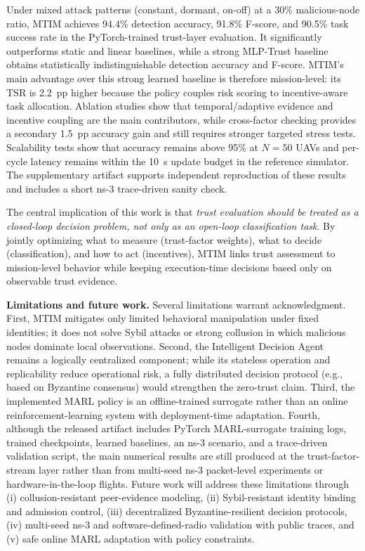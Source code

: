 \documentclass[notspecified,article,submit,moreauthors]{Definitions/mdpi}
\begin{document}
Under mixed attack patterns (constant, dormant, on-off) at a 30\% malicious-node ratio, MTIM achieves 94.4\% detection accuracy, 91.8\% F-score, and 90.5\% task success rate in the PyTorch-trained trust-layer evaluation. It significantly outperforms static and linear baselines, while a strong MLP-Trust baseline obtains statistically indistinguishable detection accuracy and F-score. MTIM's main advantage over this strong learned baseline is therefore mission-level: its TSR is 2.2~pp higher because the policy couples risk scoring to incentive-aware task allocation. Ablation studies show that temporal/adaptive evidence and incentive coupling are the main contributors, while cross-factor checking provides a secondary 1.5~pp accuracy gain and still requires stronger targeted stress tests. Scalability tests show that accuracy remains above 95\% at $N = 50$ UAVs and per-cycle latency remains within the 10~s update budget in the reference simulator. The supplementary artifact supports independent reproduction of these results and includes a short ns-3 trace-driven sanity check.

The central implication of this work is that \emph{trust evaluation should be treated as a closed-loop decision problem, not only as an open-loop classification task}. By jointly optimizing what to measure (trust-factor weights), what to decide (classification), and how to act (incentives), MTIM links trust assessment to mission-level behavior while keeping execution-time decisions based only on observable trust evidence.

\textbf{Limitations and future work.}
Several limitations warrant acknowledgment. First, MTIM mitigates only limited behavioral manipulation under fixed identities; it does not solve Sybil attacks or strong collusion in which malicious nodes dominate local observations. Second, the Intelligent Decision Agent remains a logically centralized component; while its stateless operation and replicability reduce operational risk, a fully distributed decision protocol (e.g., based on Byzantine consensus) would strengthen the zero-trust claim. Third, the implemented MARL policy is an offline-trained surrogate rather than an online reinforcement-learning system with deployment-time adaptation. Fourth, although the released artifact includes PyTorch MARL-surrogate training logs, trained checkpoints, learned baselines, an ns-3 scenario, and a trace-driven validation script, the main numerical results are still produced at the trust-factor-stream layer rather than from multi-seed ns-3 packet-level experiments or hardware-in-the-loop flights. Future work will address these limitations through (i) collusion-resistant peer-evidence modeling, (ii) Sybil-resistant identity binding and admission control, (iii) decentralized Byzantine-resilient decision protocols, (iv) multi-seed ns-3 and software-defined-radio validation with public traces, and (v) safe online MARL adaptation with policy constraints.
\end{document}
